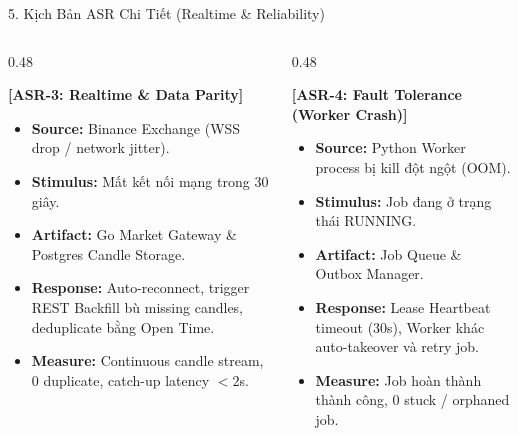 \documentclass[aspectratio=169,10pt]{beamer}
\begin{document}
\begin{frame}{5. Kịch Bản ASR Chi Tiết (Realtime \& Reliability)}
\begin{columns}[T]
\begin{column}{0.48\textwidth}
\begin{block}{\textbf{[ASR-3: Realtime \& Data Parity]}}
\begin{itemize}
  \item \textbf{Source:} Binance Exchange (WSS drop / network jitter).
  \item \textbf{Stimulus:} Mất kết nối mạng trong 30 giây.
  \item \textbf{Artifact:} Go Market Gateway \& Postgres Candle Storage.
  \item \textbf{Response:} Auto-reconnect, trigger REST Backfill bù missing candles, deduplicate bằng Open Time.
  \item \textbf{Measure:} Continuous candle stream, 0 duplicate, catch-up latency $<2$s.
\end{itemize}
\end{block}
\end{column}
\begin{column}{0.48\textwidth}
\begin{block}{\textbf{[ASR-4: Fault Tolerance (Worker Crash)]}}
\begin{itemize}
  \item \textbf{Source:} Python Worker process bị kill đột ngột (OOM).
  \item \textbf{Stimulus:} Job đang ở trạng thái RUNNING.
  \item \textbf{Artifact:} Job Queue \& Outbox Manager.
  \item \textbf{Response:} Lease Heartbeat timeout (30s), Worker khác auto-takeover và retry job.
  \item \textbf{Measure:} Job hoàn thành thành công, 0 stuck / orphaned job.
\end{itemize}
\end{block}
\end{column}
\end{columns}
\end{frame}
\end{document}
